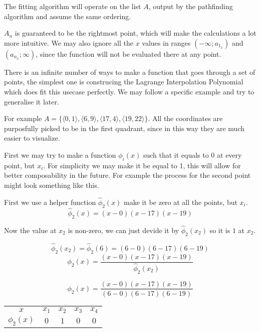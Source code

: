 \documentclass[12pt, titlepage]{article}
\begin{document}
The fitting algorithm will operate on the list $A$, output by the 
pathfinding algorithm and assume the same ordering.

$A_n$ is guaranteed to be the rightmost point, which
will make the calculations a lot more intuitive.
We may also ignore all the $x$ values in ranges 
$(-\infty; a_{1_x})$ and $(a_{n_x}; \infty)$, since the function will not be 
evaluated there at any point.

There is an infinite number of ways to make a function that goes through a set of
points, the simplest one is construcing the Lagrange Interpolation Polynomial
which does fit this usecase perfectly. We may follow a specific example 
and try to generalise it later. 

For example $A = \{\langle 0, 1 \rangle, \langle 6, 9 \rangle, 
\langle 17, 4 \rangle, \langle 19, 22 \rangle\}$. All the coordinates are
purposfully picked to be in the first quadrant, since in this way they are
much easier to visualize.

First we may try to make a function $\phi_i(x)$ such that it equals to 0 at
every point, but $x_i$. For simplicity we may make it be equal to 1, this will
allow for better composability in the future. For example the process for 
the second point might look something like this.

First we use a helper function $\hat{\phi}_2(x)$ make it be zero at all the points, but $x_i$.
\begin{equation}
    \hat{\phi}_2(x) = (x - 0)(x - 17)(x - 19)
\end{equation}

Now the value at $x_2$ is non-zero, we can just devide it by $\hat{\phi}_2(x_2)$ 
so it is $1$ at $x_2$.

\begin{equation}
    \hat{\phi}_2(x_2) = \hat{\phi}_2(6) = (6 - 0)(6 - 17)(6 - 19)
\end{equation}
\begin{equation}
    \phi_2(x) = \frac{(x - 0)(x - 17)(x - 19)}{\hat{\phi}_2(x_2)}
\end{equation}

\begin{equation}
    \phi_2(x) = \frac{(x - 0)(x - 17)(x - 19)}{(6 - 0)(6 - 17)(6 - 19)}
\end{equation}

{
\centering
\begin{tabular}{c|c c c c}
    $x$ & $x_1$ & $x_2$ & $x_3$ & $x_4$ \\
    $\phi_2(x)$ & $0$ & $1$ & $0$ & $0$ \\
\end{tabular}\par
}
\end{document}
